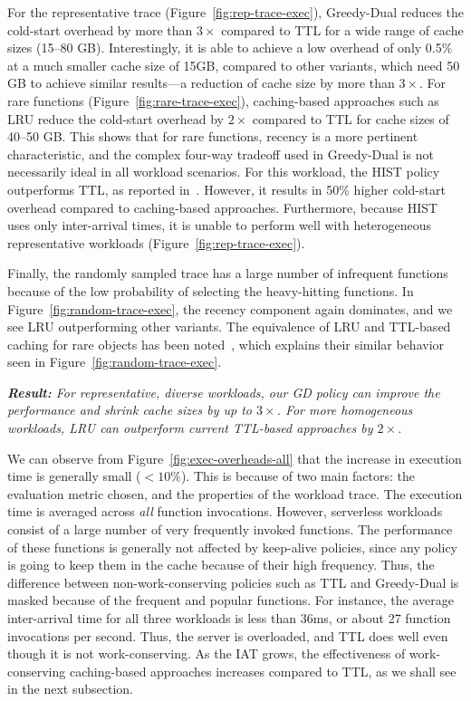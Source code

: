 For the representative trace (Figure~\ref{fig:rep-trace-exec}), Greedy-Dual reduces the cold-start overhead by more than $3\times$ compared to TTL for a wide range of cache sizes (15--80 GB). 
Interestingly, it is able to achieve a low overhead of only 0.5\% at a much smaller cache size of 15GB, compared to other variants, which need 50 GB to achieve similar results---a reduction of cache size by more than $3\times$. 
%
For rare functions (Figure~\ref{fig:rare-trace-exec}), caching-based approaches such as LRU  reduce the cold-start overhead by $2\times$ compared to TTL for cache sizes of 40--50 GB. 
This shows that for rare functions, recency is a more pertinent characteristic, and the complex four-way tradeoff used in Greedy-Dual is not necessarily ideal in all workload scenarios. 
For this workload, the HIST policy outperforms TTL, as reported in~\cite{shahrad_serverless_2020}. 
However, it results in 50\% higher cold-start overhead compared to caching-based approaches.
Furthermore, because HIST uses only inter-arrival times, it is unable to perform well with heterogeneous representative workloads  (Figure~\ref{fig:rep-trace-exec}). 


Finally, the randomly sampled trace has a large number of infrequent functions because of the low probability of selecting the heavy-hitting functions.
In Figure~\ref{fig:random-trace-exec}, the recency component again dominates, and we see LRU outperforming other variants. 
The equivalence of LRU and TTL-based caching for rare objects has been noted~\cite{basu2017adaptive,jiang2018convergence}, which explains their similar behavior seen in Figure~\ref{fig:random-trace-exec}. 


\noindent \emph{\textbf{Result:} For representative, diverse workloads, our GD policy can improve the performance and shrink cache sizes by up to $3\times$. For more homogeneous workloads, LRU can outperform current TTL-based approaches by $2\times$.}

We can observe from Figure~\ref{fig:exec-overheads-all} that the increase in execution time is generally small ($<10\%$).
This is because of two main factors: the evaluation metric chosen, and the properties of the workload trace. 
The execution time is averaged across \emph{all} function invocations.
However, serverless workloads consist of a large number of very frequently invoked functions. 
The performance of these functions is generally not affected by keep-alive policies, since any policy is going to keep them in the cache because of their high frequency. 
Thus, the difference between non-work-conserving policies such as TTL and Greedy-Dual is masked because of the frequent and popular functions. 
For instance, the average inter-arrival time for all three workloads is less than 36ms, or about 27 function invocations per second. 
Thus, the server is overloaded, and TTL does well even though it is not work-conserving. 
As the IAT grows, the effectiveness of work-conserving caching-based approaches increases compared to TTL, as we shall see in the next subsection. 

